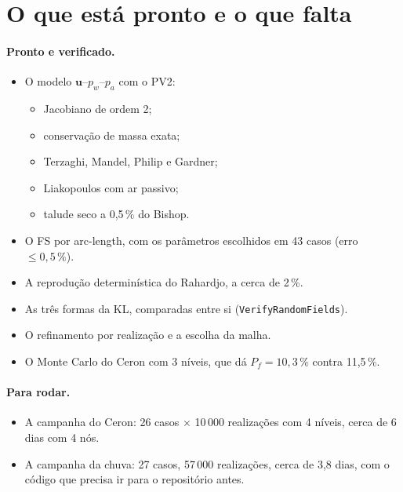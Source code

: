 \section{O que está pronto e o que falta}
\label{sec:pendencias}

\paragraph{Pronto e verificado.}
\begin{itemize}
  \item O modelo $\bm u$--$p_w$--$p_a$ com o PV2:
    \begin{itemize}
      \item Jacobiano de ordem 2;
      \item conservação de massa exata;
      \item Terzaghi, Mandel, Philip e Gardner;
      \item Liakopoulos com ar passivo;
      \item talude seco a 0,5\,\% do Bishop.
    \end{itemize}
  \item O FS por arc-length, com os parâmetros escolhidos em 43 casos (erro $\leq 0{,}5\,\%$).
  \item A reprodução determinística do Rahardjo, a cerca de 2\,\%.
  \item As três formas da KL, comparadas entre si (\texttt{VerifyRandomFields}).
  \item O refinamento por realização e a escolha da malha.
  \item O Monte Carlo do Ceron com 3 níveis, que dá $P_f = 10{,}3\,\%$ contra 11,5\,\%.
\end{itemize}

\paragraph{Para rodar.}
\begin{itemize}
  \item A campanha do Ceron: 26 casos $\times$ 10\,000 realizações com 4 níveis, cerca de 6 dias com 4 nós.
  \item A campanha da chuva: 27 casos, 57\,000 realizações, cerca de 3,8 dias, com o código que precisa ir para o
    repositório antes.
\end{itemize}


